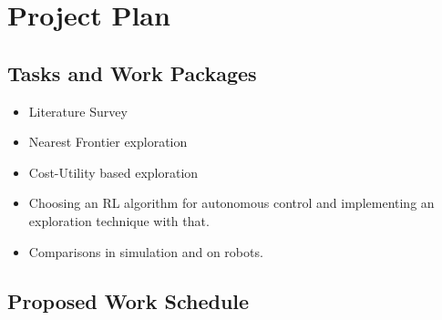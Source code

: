 \section{Project Plan}
\subsection{Tasks and Work Packages}
\begin{itemize}
\item Literature Survey
\item Nearest Frontier exploration
\item Cost-Utility based exploration
\item Choosing an RL algorithm for autonomous control and implementing an exploration technique with
 that.
\item Comparisons in simulation and on robots.
\end{itemize}
\subsection{Proposed Work Schedule}
\pagebreak
